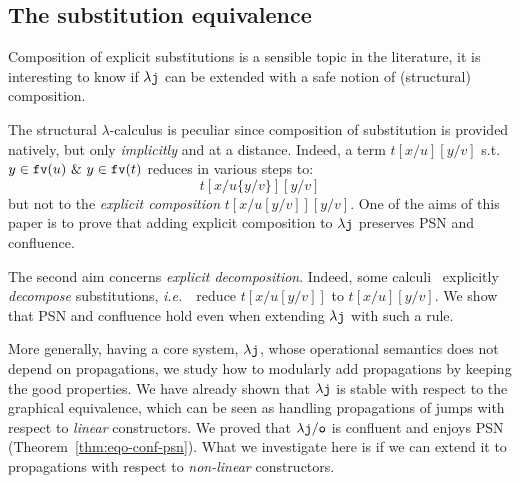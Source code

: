 \documentclass{LMCS}
\newcommand{\ie}{{\it  i.e.}~}
\renewcommand{\>}{\rightarrow}
\def\lam{\lambda}
\def\sig{\sigma}
\newcommand{\Rew}[1]{\rightarrow_{#1}}
\newcommand{\isubs}[1]{ \{ #1  \} }
\newcommand{\dis}{{\tt j}}
\newcommand{\ldis}{\lam{\dis}}
\newcommand{\lj}{\lam{\dis}}
\newcommand{\fv}[1]{{\tt fv}(#1)}
\newcommand{\CS}{{\tt CS}}
\newcommand{\terms}{\mathcal{T}}
\newcommand{\deft}[1]{{\bf #1}}
\newcommand{\ignore}[1]{}
\newcommand{\eqo}{\equiv_\osym}
\newcommand{\osym}{{\tt o}}
\newcommand{\ldiso}{\ldis/{\osym}}
\newcommand{\eqcs}{\equiv_\CS}
\begin{document}
\ignore{The fact that $\eqo$ is a strong bisimulation means that if we
  prove a normalisation result for a term $t$ then the result
  immediately lifts to all the terms in $[t]_{\eqo}$, \ie, the
  $\eqo$-equivalence class of $t$. In order to simplify some
  reasonings we shall restrict to consider only canonical
  representants of $\eqo$-equivalence classes. Consider the reduction
  relations:
\[ \begin{array}{lll@{\hspace{.5cm}}l}
   \lam y. (t [x/s]) & \Rew{\sig_1} & (\lam y. t) [x/s]  & \mbox{ if } y\notin \fv{s} \\
   t[x/s] v & \Rew{\sig_2} & (t v)[x/s] \\
   \end{array} \] 
And let $\Rew{\sigma}$ be the relation obtained as the context closure
of $\Rew{\sig_1}\cup \Rew{\sig_2}$. For us a term in
\deft{$\sig$-form} will be a $\Rew{\sigma}$-normal form. Let us show
that $\sig$-forms make sense:

\begin{lem}
$t\in\terms$. The relation $\Rew{\sigma}$ is strongly normalizing and confluent modulo $\eqcs$.
\end{lem}
}

\subsection{The  substitution equivalence}
\label{s:propp-intro}
Composition of explicit substitutions is a sensible topic in the
literature, it is interesting to know if
$\lj$ can be extended with a safe notion of (structural) composition.

The structural $\lam$-calculus is peculiar 
since composition of substitution is 
provided natively, but only \textit{implicitly} and at a distance.  Indeed, a term
$t[x/u][y/v]$ s.t.  $y\in \fv{u}\ \&\ y\in \fv{t}$  reduces in various
steps to:
$$t[x/u\isubs{y/v}][y/v]$$ but not to the \textit{explicit
  composition} $t[x/u[y/v]][y/v]$. One of the aims of this paper is to
prove that adding explicit composition to $\ldis$ preserves PSN and confluence.

The second aim concerns \textit{explicit
  decomposition}. Indeed, some calculi~\cite{OH06,MaraistOTW99,Schw99,HZ09,Hasegawa} explicitly
\textit{decompose} substitutions, \ie\ reduce $t[x/u[y/v]]$ to
$t[x/u][y/v]$. We show that PSN and confluence hold even when extending
$\lj$ with such a rule.\medskip

More generally, having a core system, $\lj$, whose operational
semantics does not depend on propagations, we study how to modularly add
propagations  by  keeping the good properties. We have
already shown that $\lj$ is stable with respect to 
the graphical equivalence, which can be seen as handling propagations
of jumps with respect to \textit{linear} constructors. We proved that $\ldiso$ is confluent and
enjoys PSN (Theorem~\ref{thm:eqo-conf-psn}). What we investigate here is if we
can extend it to propagations with respect to \textit{non-linear}
constructors.\medskip
\end{document}
